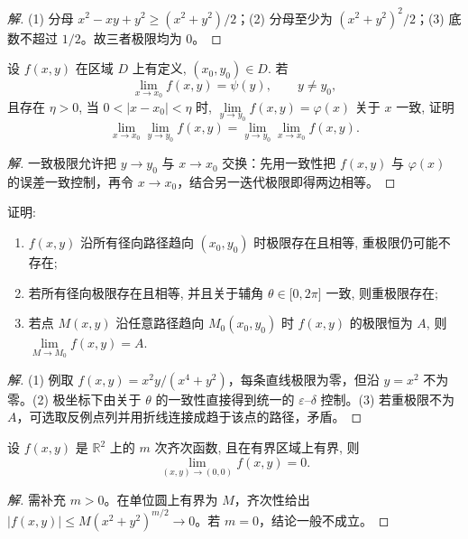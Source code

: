 \documentclass[../../数学分析培优讲义(答案版).tex]{subfiles}
\begin{document}
\begin{proof}[解]
(1) 分母 $x^2-xy+y^2\geq(x^2+y^2)/2$；(2) 分母至少为 $(x^2+y^2)^2/2$；(3) 底数不超过 $1/2$。故三者极限均为 $0$。
\end{proof}

\begin{example}
设 $f(x,y)$ 在区域 $D$ 上有定义, $(x_0,y_0)\in D$. 若
\[
    \lim\limits_{x\to x_0}f(x,y)=\psi(y),\qquad y\ne y_0,
\]
且存在 $\eta>0$, 当 $0<|x-x_0|<\eta$ 时, $\displaystyle\lim\limits_{y\to y_0}f(x,y)=\varphi(x)$ 关于 $x$ 一致, 证明
\[
    \lim\limits_{x\to x_0}\lim\limits_{y\to y_0}f(x,y)
    =\lim\limits_{y\to y_0}\lim\limits_{x\to x_0}f(x,y).
\]
\end{example}

\begin{proof}[解]
一致极限允许把 $y\to y_0$ 与 $x\to x_0$ 交换：先用一致性把 $f(x,y)$ 与 $\varphi(x)$ 的误差一致控制，再令 $x\to x_0$，结合另一迭代极限即得两边相等。
\end{proof}

\begin{example}[\markstar]
证明:
\begin{enumerate}[label=(\arabic*)]
    \item $f(x,y)$ 沿所有径向路径趋向 $(x_0,y_0)$ 时极限存在且相等, 重极限仍可能不存在;
    \item 若所有径向极限存在且相等, 并且关于辅角 $\theta\in\lbrack0,2\pi\rbrack$ 一致, 则重极限存在;
    \item 若点 $M(x,y)$ 沿任意路径趋向 $M_0(x_0,y_0)$ 时 $f(x,y)$ 的极限恒为 $A$, 则 $\displaystyle\lim\limits_{M\to M_0}f(x,y)=A$.
\end{enumerate}
\end{example}

\begin{proof}[解]
(1) 例取 $f(x,y)=x^2y/(x^4+y^2)$，每条直线极限为零，但沿 $y=x^2$ 不为零。(2) 极坐标下由关于 $\theta$ 的一致性直接得到统一的 $\varepsilon$--$\delta$ 控制。(3) 若重极限不为 $A$，可选取反例点列并用折线连接成趋于该点的路径，矛盾。
\end{proof}

\begin{example}
设 $f(x,y)$ 是 $\mathbb{R}^2$ 上的 $m$ 次齐次函数, 且在有界区域上有界, 则
\[
    \lim\limits_{(x,y)\to(0,0)}f(x,y)=0.
\]
\end{example}

\begin{proof}[解]
需补充 $m>0$。在单位圆上有界为 $M$，齐次性给出 $|f(x,y)|\leq M(x^2+y^2)^{m/2}\to0$。若 $m=0$，结论一般不成立。
\end{proof}
\end{document}
